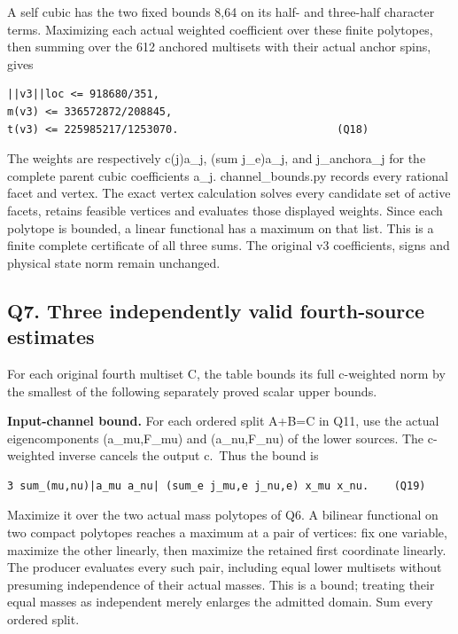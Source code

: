 \documentclass[11pt,a4paper]{article}
\renewcommand{\[}{\begingroup\small\originaldisplaystart}
\renewcommand{\]}{\originaldisplayend\endgroup}
\begin{document}
A self cubic has the two fixed bounds 8,64 on its half- and three-half
character terms. Maximizing each actual weighted coefficient over these
finite polytopes, then summing over the 612 anchored multisets with
their actual anchor spins, gives

\begin{verbatim}
||v3||loc <= 918680/351,
m(v3) <= 336572872/208845,
t(v3) <= 225985217/1253070.                         (Q18)
\end{verbatim}

The weights are respectively c(j)\textbar a\_j\textbar, (sum
j\_e)\textbar a\_j\textbar, and j\_anchor\textbar a\_j\textbar{} for the
complete parent cubic coefficients a\_j.
{\ttfamily c\allowbreak{}h\allowbreak{}a\allowbreak{}n\allowbreak{}n\allowbreak{}e\allowbreak{}l\allowbreak{}\_\allowbreak{}b\allowbreak{}o\allowbreak{}u\allowbreak{}n\allowbreak{}d\allowbreak{}s\allowbreak{}.\allowbreak{}p\allowbreak{}y\allowbreak{}}
records every rational facet and vertex. The exact vertex calculation
solves every candidate set of active facets, retains feasible vertices
and evaluates those displayed weights. Since each polytope is bounded, a
linear functional has a maximum on that list. This is a finite complete
certificate of all three sums. The original v3 coefficients, signs and
physical state norm remain unchanged.

\subsection{Q7. Three independently valid fourth-source
estimates}\label{q7.-three-independently-valid-fourth-source-estimates}

For each original fourth multiset C, the table bounds its full
c-weighted norm by the smallest of the following separately proved
scalar upper bounds.

\textbf{Input-channel bound.} For each ordered split A+B=C in Q11, use
the actual eigencomponents (a\_mu,F\_mu) and (a\_nu,F\_nu) of the lower
sources. The c-weighted inverse cancels the output c.~Thus the bound is

\begin{verbatim}
3 sum_(mu,nu)|a_mu a_nu| (sum_e j_mu,e j_nu,e) x_mu x_nu.    (Q19)
\end{verbatim}

Maximize it over the two actual mass polytopes of Q6. A bilinear
functional on two compact polytopes reaches a maximum at a pair of
vertices: fix one variable, maximize the other linearly, then maximize
the retained first coordinate linearly. The producer evaluates every
such pair, including equal lower multisets without presuming
independence of their actual masses. This is a bound; treating their
equal masses as independent merely enlarges the admitted domain. Sum
every ordered split.
\end{document}
